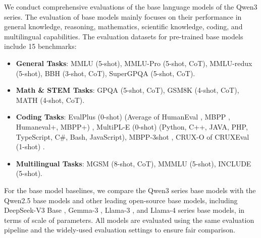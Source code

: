 We conduct comprehensive evaluations of the base language models of the Qwen3 series. 
The evaluation of base models mainly focuses on their performance in general knowledge, reasoning, mathematics, scientific knowledge, coding, and multilingual capabilities. The evaluation datasets for pre-trained base models include 15 benchmarks:


%
\begin{itemize}

\item \textbf{General Tasks}: MMLU \citep{mmlu} (5-shot), MMLU-Pro \citep{mmlupro} (5-shot, CoT), MMLU-redux \citep{mmluredux} (5-shot), BBH \citep{bbh} (3-shot, CoT), SuperGPQA \citep{supergpqa}(5-shot, CoT).

\item \textbf{Math \& STEM Tasks}: GPQA \citep{gpqa} (5-shot, CoT), GSM8K \citep{gsm8k} (4-shot, CoT), MATH \citep{math} (4-shot, CoT).

\item \textbf{Coding Tasks}: EvalPlus \citep{evalplus} (0-shot) (Average of HumanEval \citep{humaneval}, MBPP \citep{mbpp}, Humaneval+, MBPP+) \citep{evalplus}, MultiPL-E \citep{multiple} (0-shot) (Python, C++, JAVA, PHP, TypeScript, C\#, Bash, JavaScript), MBPP-3shot \citep{mbpp}, CRUX-O of CRUXEval (1-shot) \citep{gu2024cruxeval}.

\item \textbf{Multilingual Tasks}: MGSM \citep{mgsm} (8-shot, CoT), MMMLU \citep{mmmlu} (5-shot), INCLUDE \citep{romanou2024includeevaluatingmultilinguallanguage} (5-shot).

\end{itemize}


For the base model baselines, we compare the Qwen3 series base models with the Qwen2.5 base models \citep{qwen2.5} and other leading open-source base models, including DeepSeek-V3 Base \citep{deepseekv3}, Gemma-3 \citep{gemma3}, Llama-3 \citep{llama3}, and Llama-4 \citep{llama4} series base models, in terms of scale of parameters. All models are evaluated using the same evaluation pipeline and the widely-used evaluation settings to ensure fair comparison.


